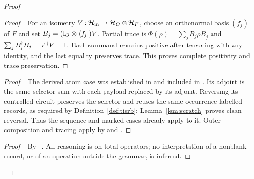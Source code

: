 \begin{proof}
 \begin{proof}\pf\ For an isometry $V:\mathcal{H}_{\rm in}\to\mathcal{H}_O\otimes
 \mathcal{H}_F$, choose an orthonormal basis $(f_j)$ of $F$ and set
 $B_j=(\mathbb{I}_O\otimes\langle f_j\rvert)V$. Partial trace is
 $\Phi(\rho)=\sum_jB_j\rho B_j^\dagger$ and
 $\sum_jB_j^\dagger B_j=V^\dagger V=\mathbb{I}$. Each summand remains
 positive after tensoring with any identity, and the last equality
 preserves trace. This proves complete positivity and trace preservation.
 \end{proof}
 \begin{proof}\pf\ The derived atom case was established in
  and included in .
 Its adjoint is the same selector sum with each payload replaced by
 its adjoint. Reversing its controlled circuit preserves the selector
 and reuses the same occurrence-labelled records, as required by
 Definition~\ref{def:tierb}; Lemma~\ref{lem:scratch} proves clean
 reversal. Thus the sequence and marked cases already apply to it.
 Outer composition and tracing apply by
  and .
 \end{proof}
 \qedstep
 \begin{proof}\pf\ By --.
 All reasoning is on total operators; no interpretation of a nonblank
 record, or of an operation outside the grammar, is inferred.
 \end{proof}
\end{proof}

